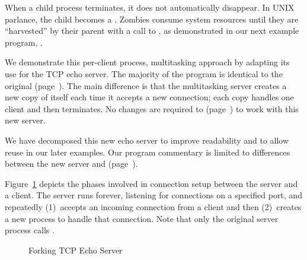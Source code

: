 When a child process terminates, it does not automatically disappear.
In UNIX parlance, the child becomes a .  Zombies
consume system resources until they are ``harvested'' by their parent with
a call to , as demonstrated in our next
example program, .

We demonstrate this per-client process, multitasking approach by
adapting its use for the TCP echo server.  The majority of the program
is identical to the original 
(page~\pageref{code/TCPEchoServer.c}).
The main difference is that the multitasking server creates a
new copy of itself each time it accepts a new connection;
each copy handles one client and then terminates.  No changes
are required to  (page~\pageref{code/TCPEchoClient.c}) to
work with this new server.

We have decomposed this new echo server to improve readability
and to allow reuse in our later examples.  Our program commentary is limited to
differences between the new server and 
(page~\pageref{code/TCPEchoServer.c}).

Figure~\ref{fig:TCPechoserver-fork} depicts the phases involved in
connection setup between the server and a client.
The server runs forever, listening for connections on a specified port,
and repeatedly (1)~accepts an incoming connection from a client and then
(2)~creates a new process to handle that connection.
Note that only the original server process calls .

\begin{figure}[htbp]
\caption{\label{fig:TCPechoserver-fork}Forking TCP Echo Server}
\end{figure}

%

